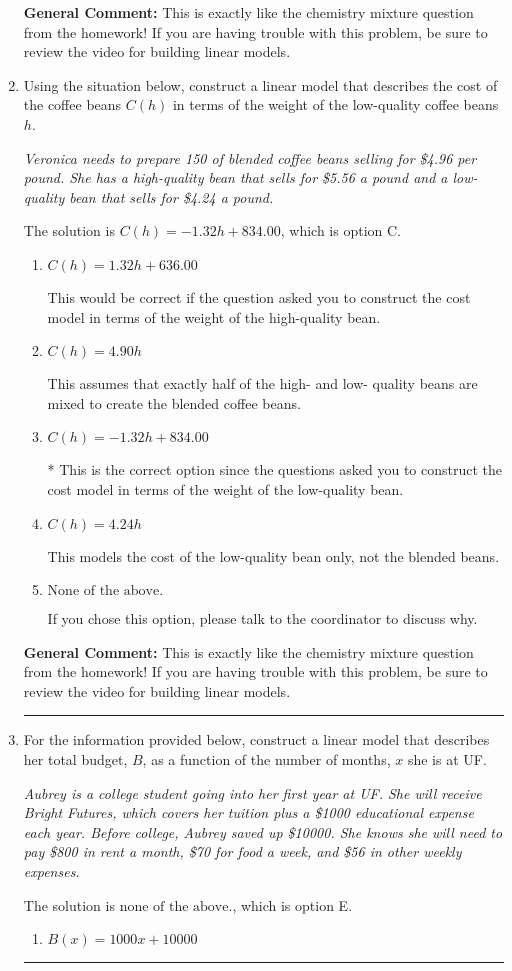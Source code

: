 \documentclass{extbook}[14pt]
\newcommand{\litem}[1]{\item #1

\rule{\textwidth}{0.4pt}}
\begin{document}
\begin{enumerate}
{\textbf{General Comment:} This is exactly like the chemistry mixture question from the homework! If you are having trouble with this problem, be sure to review the video for building linear models.
}
\litem{
Using the situation below, construct a linear model that describes the cost of the coffee beans $C(h)$ in terms of the weight of the low-quality coffee beans $h$.

\begin{center}
    \textit{ Veronica needs to prepare 150 of blended coffee beans selling for \$4.96 per pound. She has a high-quality bean that sells for \$5.56 a pound and a low-quality bean that sells for \$4.24 a pound. }
\end{center}
The solution is \( C(h) = -1.32 h + 834.00 \), which is option C.\begin{enumerate}[label=\Alph*.]
\item \( C(h) = 1.32 h + 636.00 \)

This would be correct if the question asked you to construct the cost model in terms of the weight of the high-quality bean.
\item \( C(h) = 4.90 h \)

This assumes that exactly half of the high- and low- quality beans are mixed to create the blended coffee beans.
\item \( C(h) = -1.32 h + 834.00 \)

* This is the correct option since the questions asked you to construct the cost model in terms of the weight of the low-quality bean.
\item \( C(h) = 4.24 h \)

This models the cost of the low-quality bean only, not the blended beans.
\item \( \text{None of the above.} \)

If you chose this option, please talk to the coordinator to discuss why.
\end{enumerate}

\textbf{General Comment:} This is exactly like the chemistry mixture question from the homework! If you are having trouble with this problem, be sure to review the video for building linear models.
}
\litem{
For the information provided below, construct a linear model that describes her total budget, $B$, as a function of the number of months, $x$ she is at UF.

\begin{center}
    \textit{ Aubrey is a college student going into her first year at UF. She will receive Bright Futures, which covers her tuition plus a \$1000 educational expense each year. Before college, Aubrey saved up \$10000. She knows she will need to pay \$800 in rent a month, \$70 for food a week, and \$56 in other weekly expenses. }
\end{center}
The solution is \( \text{none of the above.} \), which is option E.\begin{enumerate}[label=\Alph*.]
\item \( B(x) = 1000 x + 10000 \)


\end{enumerate}}
\end{enumerate}
\end{document}
